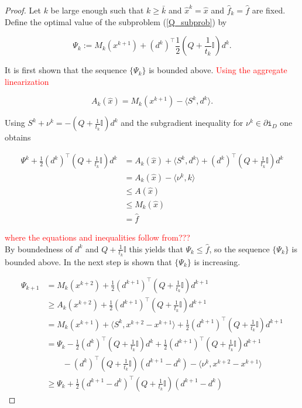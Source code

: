 \begin{proof}
	Let \(k\) be large enough such that \(k \geq \bar{k}\) and \(\hat{x}^k = \hat{x}\) and \(\hat{f}_k=\hat{f}\) are fixed.
	Define the optimal value of the subproblem (\ref{Q_subprob}) by 
	
	\begin{equation}
		\Psi_k := M_k(x^{k+1})+\left(d^k\right)^{\top}\frac{1}{2}\left(Q+\frac{1}{t_k}\mathbb{I}\right)d^k.
	\end{equation}
	
	It is first shown that the sequence \(\{\Psi_k\}\) is bounded above.
	\textcolor{red}{Using the aggregate linearization}
	
	\begin{equation}
		A_k(\hat{x}) = M_k(x^{k+1})-\langle S^k,d^k \rangle.
	\end{equation}
	
	Using \(S^k+\nu^k = -\left(Q+\frac{1}{t_k}\mathbb{I}\right)d^k\) and the subgradient inequality for \(\nu^k \in \partial \mathtt{i}_{D}\) one obtains
	
	\begin{align*}
		\Psi^k+\frac{1}{2}\left(d^{k}\right)^{\top}\left(Q+\frac{1}{t_k}\mathbb{I}\right)d^k &= A_k(\hat{x})+\langle S^k,d^k\rangle + \left(d^{k}\right)^{\top}\left(Q+\frac{1}{t_k}\mathbb{I}\right)d^k \\
		&= A_k(\hat{x})-\langle \nu^k,k \rangle \\
		&\leq A(\hat{x}) \\
		&\leq M_k(\hat{x}) \\
		& = \hat{f}
	\end{align*}
	
	\textcolor{red}{where the equations and inequalities follow from???}\\
	By boundedness of \(d^k\) and \(Q+\frac{1}{t_k}\mathbb{I}\) this yields that \(\Psi_k \leq \hat{f}\), so the sequence \(\{\Psi_k\}\) is bounded above.
	In the next step is shown that \(\{\Psi_k\}\) is increasing.
	
	\begin{align}
		\Psi_{k+1} &= M_k(x^{k+2})+\frac{1}{2}\left(d^{k+1}\right)^{\top}\left(Q+\frac{1}{t_k}\mathbb{I} \right)d^{k+1} \\
		&\geq A_k(x^{k+2})+\frac{1}{2}\left(d^{k+1}\right)^{\top}\left(Q+\frac{1}{t_k}\mathbb{I}\right)d^{k+1} \\
		&= M_k(x^{k+1})+\langle S^k,x^{k+2}-x^{k+1} \rangle +\frac{1}{2}\left(d^{k+1}\right)^{\top}\left(Q+\frac{1}{t_k}\mathbb{I}\right)d^{k+1} \\
		&= \Psi_k - \frac{1}{2}\left(d^{k}\right)^{\top}\left(Q+\frac{1}{t_k}\mathbb{I}\right)d^{k} + \frac{1}{2}\left(d^{k+1}\right)^{\top}\left(Q+\frac{1}{t_k}\mathbb{I}\right)d^{k+1} \\
		& \qquad -\left(d^{k}\right)^{\top}\left(Q+\frac{1}{t_k}\mathbb{I}\right)\left(d^{k+1} - d^{k}\right) - \langle \nu^k, x^{k+2}-x^{k+1}\rangle\\
		&\geq \Psi_k + \frac{1}{2}\left(d^{k+1}-d^{k}\right)^{\top}\left(Q+\frac{1}{t_k}\mathbb{I}\right)\left(d^{k+1} - d^{k}\right)
	\end{align}
	

\end{proof}

